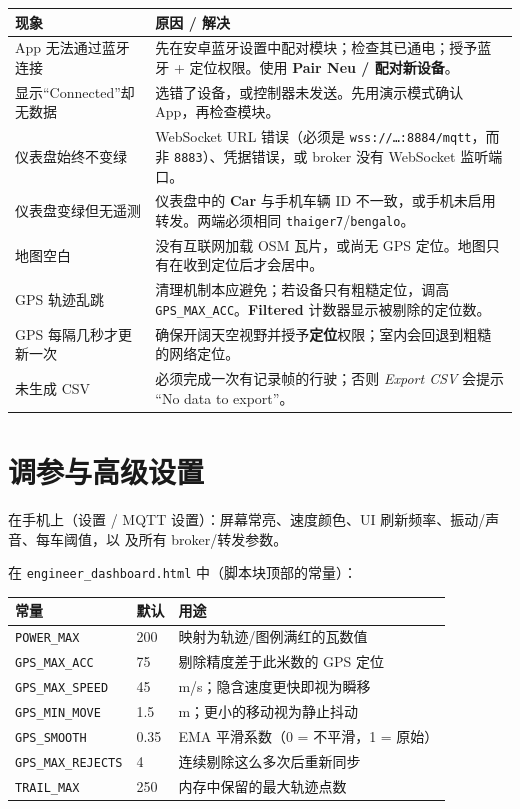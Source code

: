 \documentclass[11pt,a4paper,oneside]{report}
\newcommand{\code}[1]{\texttt{#1}}
\begin{document}
\begin{tabularx}{\linewidth}{@{}LL@{}}
\toprule
\textbf{现象} & \textbf{原因 / 解决}\\
\midrule
App 无法通过蓝牙连接 & 先在安卓蓝牙设置中配对模块；检查其已通电；授予蓝牙 + 定位权限。使用 \textbf{Pair Neu / 配对新设备}。\\
显示“Connected”却无数据 & 选错了设备，或控制器未发送。先用演示模式确认 App，再检查模块。\\
仪表盘始终不变绿 & WebSocket URL 错误（必须是 \code{wss://\ldots:8884/mqtt}，而非 \code{8883}）、凭据错误，或 broker 没有 WebSocket 监听端口。\\
仪表盘变绿但无遥测 & 仪表盘中的 \textbf{Car} 与手机车辆 ID 不一致，或手机未启用转发。两端必须相同 \code{thaiger7}/\code{bengalo}。\\
地图空白 & 没有互联网加载 OSM 瓦片，或尚无 GPS 定位。地图只有在收到定位后才会居中。\\
GPS 轨迹乱跳 & 清理机制本应避免；若设备只有粗糙定位，调高 \code{GPS\_MAX\_ACC}。\textbf{Filtered} 计数器显示被剔除的定位数。\\
GPS 每隔几秒才更新一次 & 确保开阔天空视野并授予\textbf{定位}权限；室内会回退到粗糙的网络定位。\\
未生成 CSV & 必须完成一次有记录帧的行驶；否则 \emph{Export CSV} 会提示 “No data to export”。\\
\bottomrule
\end{tabularx}

\section{调参与高级设置}
在手机上（设置 / MQTT 设置）：屏幕常亮、速度颜色、UI 刷新频率、振动/声音、每车阈值，以
及所有 broker/转发参数。

\medskip
\noindent 在 \code{engineer\_dashboard.html} 中（脚本块顶部的常量）：

\begin{tabularx}{\linewidth}{@{}llL@{}}
\toprule
\textbf{常量} & \textbf{默认} & \textbf{用途}\\
\midrule
\code{POWER\_MAX} & 200 & 映射为轨迹/图例满红的瓦数值\\
\code{GPS\_MAX\_ACC} & 75 & 剔除精度差于此米数的 GPS 定位\\
\code{GPS\_MAX\_SPEED} & 45 & m/s；隐含速度更快即视为瞬移\\
\code{GPS\_MIN\_MOVE} & 1.5 & m；更小的移动视为静止抖动\\
\code{GPS\_SMOOTH} & 0.35 & EMA 平滑系数（0 = 不平滑，1 = 原始）\\
\code{GPS\_MAX\_REJECTS} & 4 & 连续剔除这么多次后重新同步\\
\code{TRAIL\_MAX} & 250 & 内存中保留的最大轨迹点数\\
\bottomrule
\end{tabularx}
\end{document}
